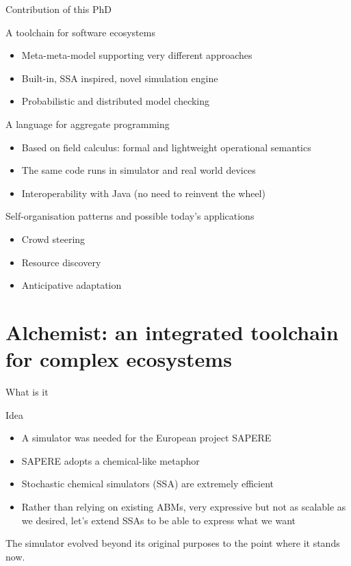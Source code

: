 \documentclass[presentation]{beamer}\mode<presentation>{\usetheme{sapere}}
\begin{document}
\begin{frame}{Contribution of this PhD}
\begin{block}{A toolchain for software ecosystems \cite{alchemist-jos2013}}
\begin{itemize}
 \item Meta-meta-model supporting very different approaches
 \item Built-in, SSA inspired, novel simulation engine
 \item Probabilistic and distributed model checking \cite{alchemist-multivesta}
\end{itemize}
\end{block}
\begin{block}{A language for aggregate programming \cite{protelis}}
\begin{itemize}
 \item Based on field calculus: formal and lightweight operational semantics
 \item The same code runs in simulator and real world devices
 \item Interoperability with Java (no need to reinvent the wheel)
\end{itemize}
\end{block}
\begin{block}{Self-organisation patterns and possible today's applications}
\begin{itemize}
   \item Crowd steering \cite{sapereecolaws-sac2012, serene-evacuation, hpcs2014, crowd-prediction}
   \item Resource discovery \cite{resource-discovery}
   \item Anticipative adaptation \cite{anticipativegradient-SASO12}
\end{itemize}
\end{block}
\end{frame}

\section{Alchemist: an integrated toolchain for complex ecosystems}
\begin{frame}{What is it}
\begin{block}{Idea}
\begin{itemize}
 \item A simulator was needed for the European project SAPERE \cite{sapere-procedia7}
 \item SAPERE adopts a chemical-like metaphor \cite{ker2014}
 \item Stochastic chemical simulators (SSA) are extremely efficient \cite{gibson2000, slepoy2008}
 \item Rather than relying on existing ABMs, very expressive but not as scalable as we desired, let's extend SSAs to be able to express what we want \cite{mass2011}
\end{itemize}
\end{block}
The simulator evolved beyond its original purposes to the point where it stands now.
\end{frame}
\end{document}

